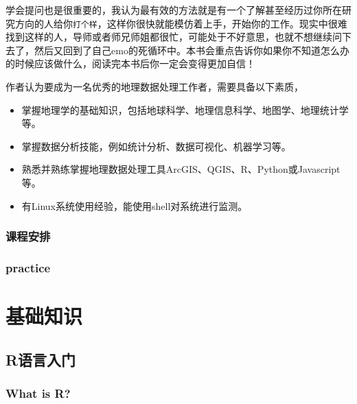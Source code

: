 \documentclass[
]{book}
\providecommand{\tightlist}{%
  \setlength{\itemsep}{0pt}\setlength{\parskip}{0pt}}
\begin{document}
学会提问也是很重要的，我认为最有效的方法就是有一个了解甚至经历过你所在研究方向的人给你\texttt{打个样}，这样你很快就能模仿着上手，开始你的工作。现实中很难找到这样的人，导师或者师兄师姐都很忙，可能处于不好意思，也就不想继续问下去了，然后又回到了自己emo的死循环中。本书会重点告诉你如果你不知道怎么办的时候应该做什么，阅读完本书后你一定会变得更加自信！

作者认为要成为一名优秀的地理数据处理工作者，需要具备以下素质，

\begin{itemize}
\tightlist
\item
  掌握地理学的基础知识，包括地球科学、地理信息科学、地图学、地理统计学等。
\item
  掌握数据分析技能，例如统计分析、数据可视化、机器学习等。
\item
  熟悉并熟练掌握地理数据处理工具ArcGIS、QGIS、R、Python或Javascript等。
\item
  有Linux系统使用经验，能使用shell对系统进行监测。
\end{itemize}

\hypertarget{ux8bfeux7a0bux5b89ux6392}{%
\section*{\texorpdfstring{\textbf{课程安排}}{课程安排}}\label{ux8bfeux7a0bux5b89ux6392}}

\hypertarget{practice}{%
\section*{\texorpdfstring{\textbf{practice}}{practice}}\label{practice}}

\hypertarget{part-ux57faux7840ux77e5ux8bc6}{%
\part{基础知识}\label{part-ux57faux7840ux77e5ux8bc6}}

\hypertarget{rux8bedux8a00ux5165ux95e8}{%
\chapter{R语言入门}\label{rux8bedux8a00ux5165ux95e8}}

\hypertarget{what-is-r}{%
\section{What is R?}\label{what-is-r}}
\end{document}

